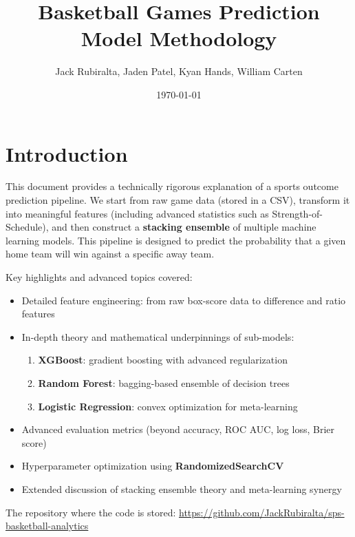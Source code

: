 \documentclass[12pt]{article}
\title{Basketball Games Prediction Model Methodology}
\author{Jack Rubiralta, Jaden Patel, Kyan Hands, William Carten}
\date{\today}
\begin{document}
\maketitle
\pagebreak

\section{Introduction}
This document provides a technically rigorous explanation of a sports outcome prediction pipeline. We start from raw game data (stored in a CSV), transform it into meaningful features (including advanced statistics such as Strength-of-Schedule), and then construct a \textbf{stacking ensemble} of multiple machine learning models. This pipeline is designed to predict the probability that a given home team will win against a specific away team.

Key highlights and advanced topics covered:
\begin{itemize}[noitemsep]
    \item Detailed feature engineering: from raw box-score data to difference and ratio features
    \item In-depth theory and mathematical underpinnings of sub-models:
    \begin{enumerate}[label=\arabic*)]
        \item \textbf{XGBoost}: gradient boosting with advanced regularization
        \item \textbf{Random Forest}: bagging-based ensemble of decision trees
        \item \textbf{Logistic Regression}: convex optimization for meta-learning
    \end{enumerate}
    \item Advanced evaluation metrics (beyond accuracy, ROC AUC, log loss, Brier score)
    \item Hyperparameter optimization using \textbf{RandomizedSearchCV}
    \item Extended discussion of stacking ensemble theory and meta-learning synergy
\end{itemize}
\noindent
The repository where the code is stored: \url{https://github.com/JackRubiralta/sps-basketball-analytics}

\end{document}
